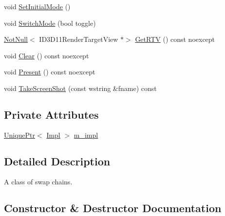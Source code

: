\begin{DoxyCompactItemize}
\item 
void \hyperlink{classmage_1_1rendering_1_1_swap_chain_a7ceec40e9007d1d6be3bdcd003fe9985}{Set\+Initial\+Mode} ()
\item 
void \hyperlink{classmage_1_1rendering_1_1_swap_chain_a184b5aa11bdc69f7b6077de9ec0c47e0}{Switch\+Mode} (bool toggle)
\item 
\hyperlink{namespacemage_a8769f9d670d6b585ea306cb1062af94b}{Not\+Null}$<$ I\+D3\+D11\+Render\+Target\+View $\ast$$>$ \hyperlink{classmage_1_1rendering_1_1_swap_chain_afa9c115a04dac008228c668169dd8bd5}{Get\+R\+TV} () const noexcept
\item 
void \hyperlink{classmage_1_1rendering_1_1_swap_chain_ab834da2afc837fe4c113f86c300af264}{Clear} () const noexcept
\item 
void \hyperlink{classmage_1_1rendering_1_1_swap_chain_a6739d35cf37b6d50adc70eb09cba2446}{Present} () const noexcept
\item 
void \hyperlink{classmage_1_1rendering_1_1_swap_chain_a833d4eb8c091c49aaedaa3f3a2e6c159}{Take\+Screen\+Shot} (const wstring \&fname) const
\end{DoxyCompactItemize}
\subsection*{Private Attributes}
\begin{DoxyCompactItemize}
\item 
\hyperlink{namespacemage_a3316d7143a973e37adf1110f2e80ca31}{Unique\+Ptr}$<$ \hyperlink{classmage_1_1rendering_1_1_swap_chain_1_1_impl}{Impl} $>$ \hyperlink{classmage_1_1rendering_1_1_swap_chain_a983645d6494b7e731753def5356bb8e6}{m\+\_\+impl}
\end{DoxyCompactItemize}


\subsection{Detailed Description}
A class of swap chains. 

\subsection{Constructor \& Destructor Documentation}
\hypertarget{classmage_1_1rendering_1_1_swap_chain_a711f0c9750a2ff68a71bb9e333b2eba7}{}\label{classmage_1_1rendering_1_1_swap_chain_a711f0c9750a2ff68a71bb9e333b2eba7} 
